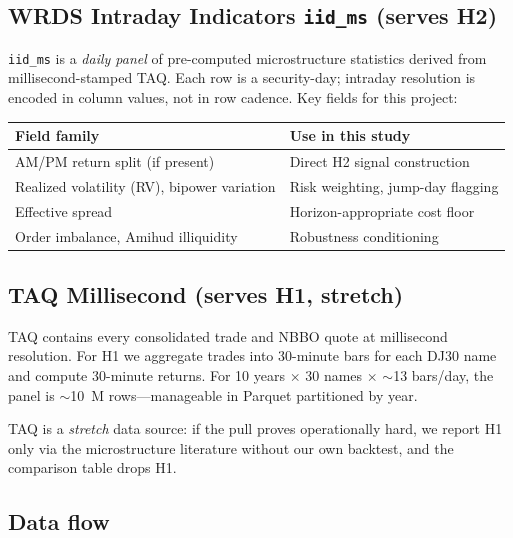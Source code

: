 \documentclass[11pt,letterpaper]{article}
\begin{document}
\subsection{WRDS Intraday Indicators \texttt{iid\_ms} (serves H2)}

\texttt{iid\_ms} is a \emph{daily panel} of pre-computed microstructure statistics derived from millisecond-stamped TAQ. Each row is a security-day; intraday resolution is encoded in column values, not in row cadence. Key fields for this project:

\begin{center}\small
\begin{tabular}{@{}ll@{}}
\toprule
\textbf{Field family} & \textbf{Use in this study}\\
\midrule
AM/PM return split (if present) & Direct H2 signal construction\\
Realized volatility (RV), bipower variation  & Risk weighting, jump-day flagging\\
Effective spread                             & Horizon-appropriate cost floor\\
Order imbalance, Amihud illiquidity          & Robustness conditioning\\
\bottomrule
\end{tabular}
\end{center}

\subsection{TAQ Millisecond (serves H1, stretch)}

TAQ contains every consolidated trade and NBBO quote at millisecond resolution. For H1 we aggregate trades into 30-minute bars for each DJ30 name and compute 30-minute returns. For 10 years $\times$ 30 names $\times$ $\sim$13 bars/day, the panel is $\sim$10~M rows---manageable in Parquet partitioned by year.

TAQ is a \emph{stretch} data source: if the pull proves operationally hard, we report H1 only via the microstructure literature without our own backtest, and the comparison table drops H1.

\subsection{Data flow}
\end{document}
